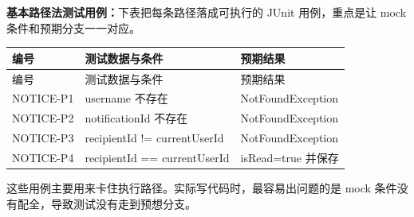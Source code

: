 \documentclass[bwprint]{report}
\begin{document}
\textbf{基本路径法测试用例：}下表把每条路径落成可执行的 JUnit 用例，重点是让 mock 条件和预期分支一一对应。
{
\setlength{\tabcolsep}{3pt}
\begin{longtable}{P{2.4cm}P{4.9cm}P{5.8cm}}
\toprule
编号 & 测试数据与条件 & 预期结果\\
\midrule
\endfirsthead
\toprule
编号 & 测试数据与条件 & 预期结果\\
\midrule
\endhead
NOTICE-\hspace{0pt}P1 & username 不存在 & Not\hspace{0pt}Found\hspace{0pt}Exception \\
NOTICE-\hspace{0pt}P2 & notification\hspace{0pt}Id 不存在 & Not\hspace{0pt}Found\hspace{0pt}Exception \\
NOTICE-\hspace{0pt}P3 & recipient\hspace{0pt}Id != current\hspace{0pt}User\hspace{0pt}Id & Not\hspace{0pt}Found\hspace{0pt}Exception \\
NOTICE-\hspace{0pt}P4 & recipient\hspace{0pt}Id == current\hspace{0pt}User\hspace{0pt}Id & is\hspace{0pt}Read=\hspace{0pt}true 并保存 \\
\bottomrule
\end{longtable}
}
这些用例主要用来卡住执行路径。实际写代码时，最容易出问题的是 mock 条件没有配全，导致测试没有走到预想分支。
\end{document}
